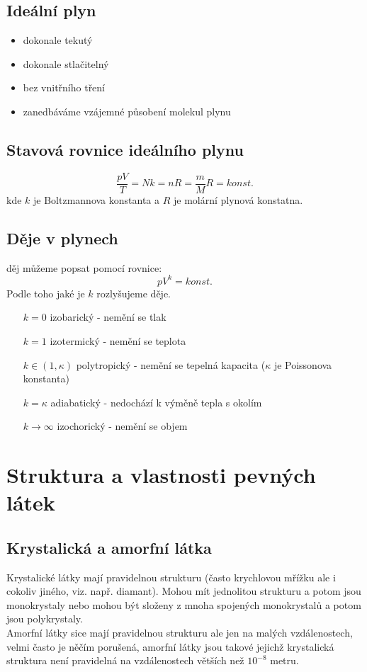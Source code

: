 \documentclass[titlepage]{book}
\begin{document}
\section{Ideální plyn}
\begin{itemize}
\item dokonale tekutý
\item dokonale stlačitelný
\item bez vnitřního tření
\item zanedbáváme vzájemné působení molekul plynu
\end{itemize}
\section{Stavová rovnice ideálního plynu}
\begin{equation}
\frac{pV}{T} = Nk = nR = \frac{m}{M}R = konst.
\end{equation}
kde $k$ je Boltzmannova konstanta a $R$ je molární plynová konstatna.
\section{Děje v plynech}
děj můžeme popsat pomocí rovnice:\\
\begin{equation}
pV^k = konst.
\end{equation}
Podle toho jaké je $k$ rozlyšujeme děje.\\
\begin{itemize}
\item[$k=0$] izobarický - nemění se tlak
\item[$k=1$] izotermický - nemění se teplota
\item[$k \in (1, \kappa)$] polytropický - nemění se tepelná kapacita ($\kappa$ je Poissonova konstanta)
\item[$k=\kappa$] adiabatický - nedochází k výměně tepla s okolím
\item[$k \rightarrow \infty$] izochorický - nemění se objem
\end{itemize}
\chapter{Struktura a vlastnosti pevných látek}
\section{Krystalická a amorfní látka}
Krystalické látky mají pravidelnou strukturu (často krychlovou mřížku ale i cokoliv jiného, viz. např. diamant). Mohou mít jednolitou strukturu a potom jsou monokrystaly nebo mohou být složeny z mnoha spojených monokrystalů a potom jsou polykrystaly.\\
Amorfní látky sice mají pravidelnou strukturu ale jen na malých vzdálenostech, velmi často je něčím porušená, amorfní látky jsou takové jejichž krystalická struktura není pravidelná na vzdálenostech větších než $10^{-8}$ metru.
\end{document}
